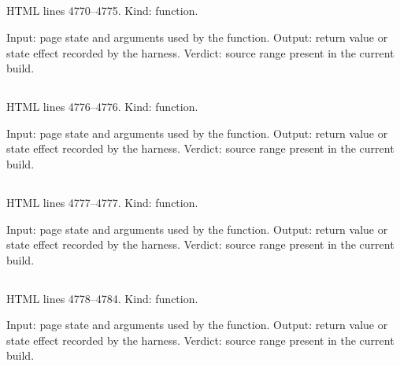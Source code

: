 \subsection*{\texttt{}}
\label{vf_199_forensicSnapshot}
HTML lines 4770--4775. Kind: function.

Input: page state and arguments used by the function.
Output: return value or state effect recorded by the harness.
Verdict: source range present in the current build.

\subsection*{\texttt{}}
\label{vf_200_extraForensicEvents}
HTML lines 4776--4776. Kind: function.

Input: page state and arguments used by the function.
Output: return value or state effect recorded by the harness.
Verdict: source range present in the current build.

\subsection*{\texttt{}}
\label{vf_201_reviewForensicEventsCore}
HTML lines 4777--4777. Kind: function.

Input: page state and arguments used by the function.
Output: return value or state effect recorded by the harness.
Verdict: source range present in the current build.

\subsection*{\texttt{}}
\label{vf_202_forensicCounts}
HTML lines 4778--4784. Kind: function.

Input: page state and arguments used by the function.
Output: return value or state effect recorded by the harness.
Verdict: source range present in the current build.

